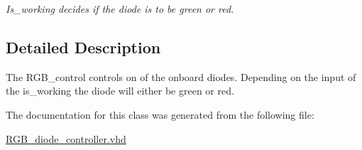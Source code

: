 \begin{DoxyCompactItemize}
\begin{DoxyCompactList}\small\item\em Is\-\_\-working decides if the diode is to be green or red. \end{DoxyCompactList}\end{DoxyCompactItemize}


\subsection{Detailed Description}
The R\-G\-B\-\_\-control controls on of the onboard diodes. Depending on the input of the is\-\_\-working the diode will either be green or red. 

The documentation for this class was generated from the following file\-:\begin{DoxyCompactItemize}
\item 
\hyperlink{RGB__diode__controller_8vhd}{R\-G\-B\-\_\-diode\-\_\-controller.\-vhd}\end{DoxyCompactItemize}
